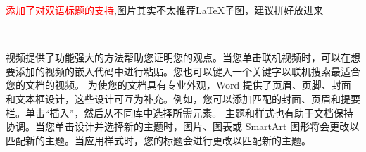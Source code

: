\textcolor{red}{添加了对双语标题的支持},图片其实不太推荐\LaTeX 子图，建议拼好放进来

\begin{figure}[H]
\centering
{}
\\
\hspace{3cm}

\label{fig:binaural_recording}
\end{figure}

视频提供了功能强大的方法帮助您证明您的观点。当您单击联机视频时，可以在想要添加的视频的嵌入代码中进行粘贴。您也可以键入一个关键字以联机搜索最适合您的文档的视频。
为使您的文档具有专业外观，Word 提供了页眉、页脚、封面和文本框设计，这些设计可互为补充。例如，您可以添加匹配的封面、页眉和提要栏。单击“插入”，然后从不同库中选择所需元素。
主题和样式也有助于文档保持协调。当您单击设计并选择新的主题时，图片、图表或 SmartArt 图形将会更改以匹配新的主题。当应用样式时，您的标题会进行更改以匹配新的主题。

